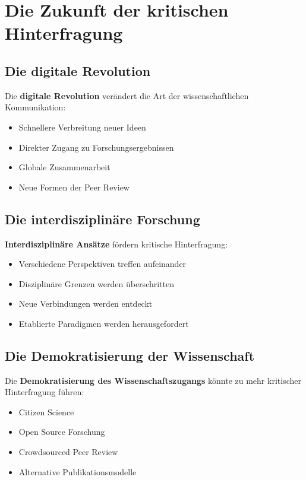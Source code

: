 \documentclass[12pt,a4paper]{report}
\begin{document}
	\section{Die Zukunft der kritischen Hinterfragung}
	
	\subsection{Die digitale Revolution}
	
	Die \textbf{digitale Revolution} verändert die Art der wissenschaftlichen Kommunikation:
	
	\begin{itemize}
		\item Schnellere Verbreitung neuer Ideen
		\item Direkter Zugang zu Forschungsergebnissen
		\item Globale Zusammenarbeit
		\item Neue Formen der Peer Review
	\end{itemize}
	
	\subsection{Die interdisziplinäre Forschung}
	
	\textbf{Interdisziplinäre Ansätze} fördern kritische Hinterfragung:
	
	\begin{itemize}
		\item Verschiedene Perspektiven treffen aufeinander
		\item Disziplinäre Grenzen werden überschritten
		\item Neue Verbindungen werden entdeckt
		\item Etablierte Paradigmen werden herausgefordert
	\end{itemize}
	
	\subsection{Die Demokratisierung der Wissenschaft}
	
	Die \textbf{Demokratisierung des Wissenschaftszugangs} könnte zu mehr kritischer Hinterfragung führen:
	
	\begin{itemize}
		\item Citizen Science
		\item Open Source Forschung
		\item Crowdsourced Peer Review
		\item Alternative Publikationsmodelle
	\end{itemize}
	
\end{document}
